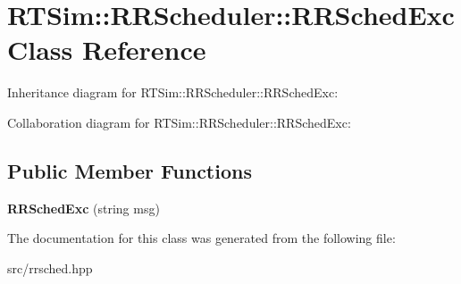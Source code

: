 \hypertarget{classRTSim_1_1RRScheduler_1_1RRSchedExc}{}\section{R\+T\+Sim\+:\+:R\+R\+Scheduler\+:\+:R\+R\+Sched\+Exc Class Reference}
\label{classRTSim_1_1RRScheduler_1_1RRSchedExc}


Inheritance diagram for R\+T\+Sim\+:\+:R\+R\+Scheduler\+:\+:R\+R\+Sched\+Exc\+:


Collaboration diagram for R\+T\+Sim\+:\+:R\+R\+Scheduler\+:\+:R\+R\+Sched\+Exc\+:
\subsection*{Public Member Functions}
\begin{DoxyCompactItemize}
\item 
{\bfseries R\+R\+Sched\+Exc} (string msg)\hypertarget{classRTSim_1_1RRScheduler_1_1RRSchedExc_a78feb6b1cda4b447eed498e2b971e7f8}{}\label{classRTSim_1_1RRScheduler_1_1RRSchedExc_a78feb6b1cda4b447eed498e2b971e7f8}

\end{DoxyCompactItemize}


The documentation for this class was generated from the following file\+:\begin{DoxyCompactItemize}
\item 
src/rrsched.\+hpp\end{DoxyCompactItemize}

